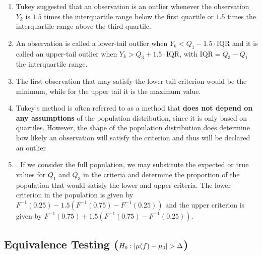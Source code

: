 \begin{enumerate}
    \item Tukey suggested that an observation is an outlier whenever the observation $Y_k$ is $1.5$ times the interquartile range below the first quartile or $1.5$ times the interquartile range above the third quartile. 
    \hfill \cite{statistics/book/Statistics-for-Data-Scientists/Maurits-Kaptein}
    
    \item An observation is called a lower-tail outlier when $Y_k < Q_1 - 1.5\cdot\text{IQR}$ and it is called an upper-tail outlier when $Y_k > Q_3 + 1.5\cdot \text{IQR}$, with $\text{IQR} = Q_3 - Q_1$ the interquartile range. 
    \hfill \cite{statistics/book/Statistics-for-Data-Scientists/Maurits-Kaptein}
    
    \item The first observation that may satisfy the lower tail criterion would be the minimum, while for the upper tail it is the maximum value.
    \hfill \cite{statistics/book/Statistics-for-Data-Scientists/Maurits-Kaptein}

    \item Tukey’s method is often referred to as a method that \textbf{does not depend on any assumptions} of the population distribution, since it is only based on quartiles. 
    However, the shape of the population distribution does determine how likely an observation will satisfy the criterion and thus will be declared an outlier
    \hfill \cite{statistics/book/Statistics-for-Data-Scientists/Maurits-Kaptein}

    \item . If we consider the full population, we may substitute the expected or true values for $Q_1$ and $Q_3$ in the criteria and determine the proportion of the population that would satisfy the lower and upper criteria. 
    The lower criterion in the population is given by $F^{-1}(0.25) - 1.5(F^{-1}(0.75) - F^{-1}(0.25))$ and the upper criterion is given by $F^{-1}(0.75) + 1.5(F^{-1}(0.75) - F^{-1}(0.25))$.
    \hfill \cite{statistics/book/Statistics-for-Data-Scientists/Maurits-Kaptein}

\end{enumerate}






\subsection{Equivalence Testing ($H_0 : \left| \mu( f ) - \mu_0 \right| > \Delta$)}

